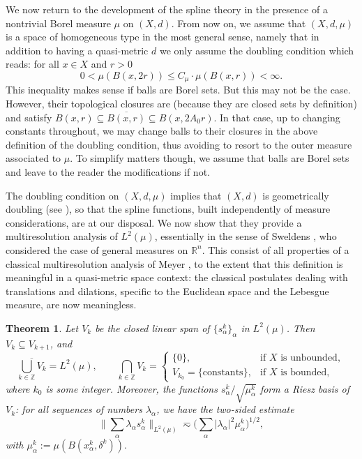 \documentclass{amsart}
\numberwithin{equation}{section}
\theoremstyle{plain}
\newtheorem{theorem}[equation]{Theorem}
\theoremstyle{definition}
\theoremstyle{remark}
\begin{document}
{{We now return to the development of the spline theory in the presence of a nontrivial Borel measure $\mu$ on $(X,d)$. From now on, we assume that $(X,d,\mu)$ is a space of homogeneous type in the most general sense, namely that in addition to having a quasi-metric $d$ we only assume the doubling condition    which reads:   for all $x\in X$ and $r>0$ 
\begin{equation*}
0<  \mu(B(x,2r))\leq C_{\mu}\cdot\mu(B(x,r))<\infty.
\end{equation*}
This inequality makes sense if balls are Borel sets. But this may not be the case.  However, their topological closures are (because they are closed sets by definition) and satisfy $B(x,r) \subseteq \overline{B(x,r)} \subseteq B(x,2A_{0}r)$. In that case, up to changing constants throughout, we may change balls to their closures in the above definition of the doubling condition, thus avoiding to resort to the outer measure associated to $\mu$. To simplify matters though, we assume that balls are Borel sets and leave to the reader the modifications if not.

The doubling condition on $(X,d,\mu)$ implies that $(X,d)$ is geometrically doubling (see \cite{CW}), so that  the spline functions, built independently of measure considerations, are  at our disposal. 
We now show that they provide a multiresolution analysis of $L^2(\mu)$, {essentially in the sense of Sweldens \cite[Definition 3.1]{Sweldens}, who considered the case of general measures on ${\mathbb{R}}^n$. This consist of all properties of a classical multiresolution analysis of Meyer \cite[Definition 2.1]{M2}, to the extent that this definition is meaningful in a quasi-metric space context: the classical postulates dealing with translations and dilations, specific to the Euclidean space and the Lebesgue measure, are now meaningless.}

\begin{theorem}\label{thm:multires}
Let $V_k$ be the closed linear span of $\{s^k_\alpha\}_\alpha$ {in $L^2(\mu)$}. Then $V_k\subseteq V_{k+1}$, and
\begin{equation*}
  \overline{\bigcup_{k\in{\mathbb{Z}}}V_k}=L^2(\mu),\qquad
  \bigcap_{k\in{\mathbb{Z}}}V_k=\begin{cases} \{0\}, & \text{if $X$ is unbounded}, \\ V_{k_0}=\{\mathrm{constants}\}, & \text{if $X$ is bounded}, \end{cases}
\end{equation*}
where $k_0$ is some integer.
Moreover, the functions $s^k_\alpha/\sqrt{\mu^k_{\alpha}}$ form a Riesz basis of $V_k$: for all sequences of numbers $\lambda_{\alpha}$, we have the two-sided estimate
\begin{equation*}
  {\Big\|{\sum_{\alpha}\lambda_{\alpha}s^k_{\alpha}}\Big\|_{{L^2(\mu)}}}\eqsim\Big(\sum_{\alpha}{|{\lambda_{\alpha}}|}^2 \mu^k_{\alpha}\Big)^{1/2},
\end{equation*}
with $\mu^k_{\alpha}:= \mu(B(x^k_{\alpha},\delta^k)).$
\end{theorem}

}}
\end{document}

